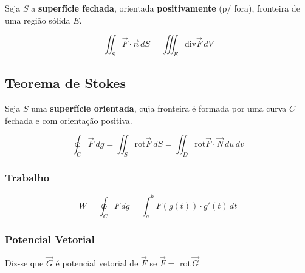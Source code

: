 \documentclass[11pt, a4paper]{article}
\begin{document}
Seja $S$ a \textbf{superfície fechada}, orientada \textbf{positivamente} (p/
fora), fronteira de uma região sólida $E$.

\begin{equation*}
    \iint_S \vec{F} \cdot \vec{n} \, dS =
    \iiint_E \text{div} \vec{F} \, dV
\end{equation*}

\subsection{Teorema de Stokes}

Seja $S$ uma \textbf{superfície orientada}, cuja fronteira é formada por uma
curva $C$ fechada e com orientação positiva.

\begin{equation*}
    \oint_C \vec{F} \ dg =
    \iint_S \text{rot} \vec{F} \ dS =
    \iint_D \text{rot} \vec{F} \cdot \vec{N} \, du\,dv
\end{equation*}

\subsubsection{Trabalho}
\begin{equation*}
    W = \oint_C F \, dg =
    \int_{a}^{b} F\left(g(t)\right) \cdot g'(t) \, dt
\end{equation*}

\subsubsection{Potencial Vetorial}

Diz-se que $\vec{G}$ é potencial vetorial de $\vec{F}$ se $\vec{F} =$ rot\,$\vec{G}$
\end{document}
